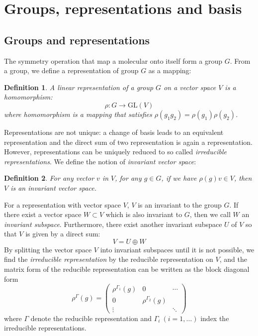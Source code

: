 \documentclass{article}
\newtheorem{definition}{Definition}
\begin{document}
\section{Groups, representations and basis}
\subsection{Groups and representations}
The symmetry operation that map a molecular onto itself form a group $G$. From a group,
we define a representation of group $G$ as a mapping:
\begin{definition}
    A linear \emph{representation} of a group $G$ on a vector space $V$ is a homomorphism:
    \[\rho\colon G \to \text{GL}(V)\]
    where homomorphism is a mapping that satisfies $\rho(g_1g_2) = \rho(g_1)\rho(g_2)$.
\end{definition}
Representations are not unique: a change of basis leads to an equivalent representation 
and the direct sum of two representation is again a representation. However, representations
can be uniquely reduced to so called \emph{irreducible representations}.
We define the notion of \emph{invariant vector space}:
\begin{definition}
    For any vector $v$ in $V$, for any $g\in G$, if we have $\rho(g)v \in V$, then $V$
    is an invariant vector space.
\end{definition} 
For a representation with vector space $V$, $V$ is an invariant to the group $G$. 
If there exist a vector space $W\subset V$ which is also invariant to $G$, then we call $W$
an \emph{invariant subspace}. 
Furthermore, there exist another invariant subspace $U$ of $V$ so that $V$ is given by a direct sum:
\begin{equation}
    V = U \oplus W
\end{equation}
By splitting the vector space $V$ into invariant subspaces until it is not possible, we find the 
\emph{irreducible representation} by the reducible representation on $V$, and the matrix form 
of the reducible representation can be written as the block diagonal form
\begin{equation}
    \rho^{\Gamma}(g) = \left(  
        \begin{matrix}
            \rho^{\Gamma_1} (g) & 0 & \cdots\\
            0 & \rho^{\Gamma_2} (g) & \\
            \vdots &  & \ddots
        \end{matrix}
    \right)
\end{equation}
where $\Gamma$ denote the reducible representation and $\Gamma_i\ (i = 1, \dots)$ index 
the irreducible representations.
\end{document}
